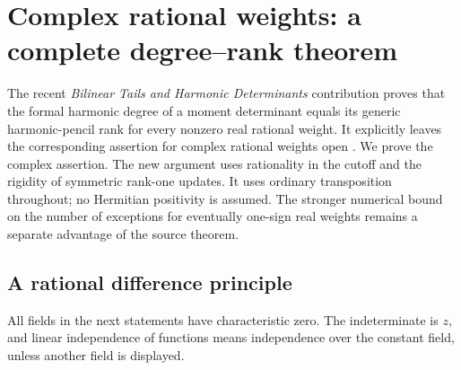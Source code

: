 \documentclass[11pt,a4paper]{article}
\theoremstyle{definition}
\theoremstyle{remark}
\numberwithin{equation}{section}
\begin{document}

\section{Complex rational weights: a complete degree--rank theorem}
\label{cr:section}

The recent \emph{Bilinear Tails and Harmonic Determinants} contribution
proves that the formal harmonic degree of a moment determinant equals
its generic harmonic-pencil rank for every nonzero real rational weight.
It explicitly leaves the corresponding assertion for complex rational
weights open \cite[Section~5, Corollary \texttt{deg:rational};
Section~10, ``Complex weights and sharp cutoff exceptions'']{BilinearIncoming}.
We prove the complex assertion.  The new argument uses rationality in
the cutoff and the rigidity of symmetric rank-one updates.  It uses
ordinary transposition throughout; no Hermitian positivity is assumed.
The stronger numerical bound on the number of exceptions for eventually
one-sign real weights remains a separate advantage of the source theorem.

\subsection{A rational difference principle}

All fields in the next statements have characteristic zero.  The
indeterminate is $z$, and linear independence of functions means
independence over the constant field, unless another field is displayed.
\end{document}
